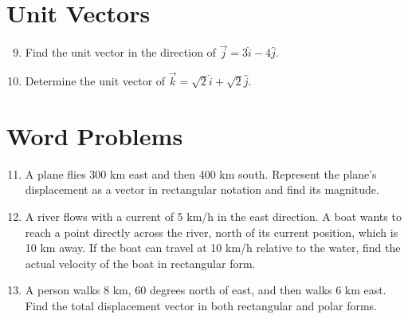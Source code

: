 \documentclass{article}
\begin{document}
\section*{Unit Vectors}
\begin{enumerate}
    \setcounter{enumi}{8}
    \item Find the unit vector in the direction of $\vec{j} = 3\hat{i} - 4\hat{j}$.
    \item Determine the unit vector of $\vec{k} = \sqrt{2}\hat{i} + \sqrt{2}\hat{j}$.
\end{enumerate}

\section*{Word Problems}
\begin{enumerate}
    \setcounter{enumi}{10}
    \item A plane flies 300 km east and then 400 km south. Represent the plane's displacement as a vector in rectangular notation and find its magnitude.
    \item A river flows with a current of 5 km/h in the east direction. A boat wants to reach a point directly across the river, north of its current position, which is 10 km away. If the boat can travel at 10 km/h relative to the water, find the actual velocity of the boat in rectangular form.
    \item A person walks 8 km, 60 degrees north of east, and then walks 6 km east. Find the total displacement vector in both rectangular and polar forms.
\end{enumerate}
\end{document}
